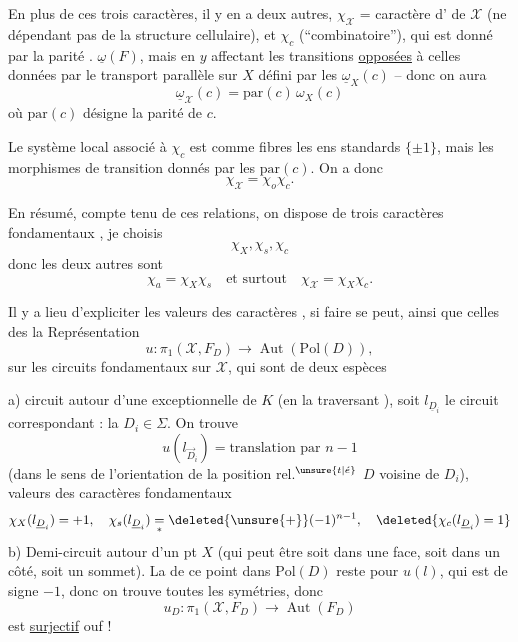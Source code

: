 En plus de ces trois caractères, il y en a deux autres, $\chi_{\mathscr X}$ = caractère d' de $\mathscr X$ (ne dépendant pas de la structure cellulaire), et $\chi_c$ (``combinatoire''), qui est donné par la parité .
  $\underline{\omega}(F)$, mais en $y$ affectant les transitions \uline{opposées} à celles données par  le transport parallèle sur $X$ défini par les $\underline{\omega}_X(c)$ -- donc on aura
\[
\underline{\omega}_{\mathscr X}(c)=\mathrm{par}(c)\,\omega_X(c)
\]
où $\mathrm{par}(c)$ désigne la parité de $c$.

 Le système local associé à $\chi_c$ est  comme fibres les ens standards $\{\pm1\}$, mais les morphismes de transition donnés par les $\mathrm{par}(c)$. On a donc
\[
\boxed{\chi_{\mathscr X}=\chi_o\chi_c}.
\]

En résumé, compte tenu de ces relations, on dispose de trois caractères fondamentaux , je choisis
\[
\chi_X,\chi_s,\chi_c
\]
donc les deux autres sont
\[
\chi_a=\chi_X\chi_s\quad\text{et surtout}\quad\chi_{\mathscr X}=\chi_X\chi_c.
\]

Il y a lieu d'expliciter les valeurs des caractères , si faire se peut, ainsi que celles des la Représentation
\[
u:\pi_1(\mathscr X,F_D)\longrightarrow\operatorname{Aut}(\mathrm{Pol}(D)),
\]
sur les circuits fondamentaux sur $\mathscr X$, qui sont de deux espèces

a)  circuit autour d'une  exceptionnelle de $K$ (en la traversant  ), soit $l_{\underline D_i}$ le circuit correspondant : la  $D_i\in\Sigma$. On trouve
\[
u(l_{\vec D_i})=\text{translation par }n-1
\]
(dans le sens de l'orientation de la position rel.$^{\unsure{t|\acute e}}$  $D$ voisine de $D_i$), valeurs des caractères fondamentaux
\[
\chi_X(l_{\underline D_i})=+1,\quad\chi_s(l_{\underline D_i})\underset{*}{=}\deleted{\unsure{+}}(-1)^{n-1},\quad\deleted{\chi_c(l_{\underline D_i})=1}
\]
b) Demi-circuit autour d'un pt  $X$ (qui peut être soit dans une face, soit dans un côté, soit  un sommet). La   de ce point dans $\mathrm{Pol}(D)$ reste  pour $u(l)$, qui est de signe $-1$, donc on trouve toutes les symétries, donc
\[
u_D:\pi_1(\mathscr X,F_D)\longrightarrow\operatorname{Aut}(F_D)
\]
est \uline{surjectif} \quad ouf !

